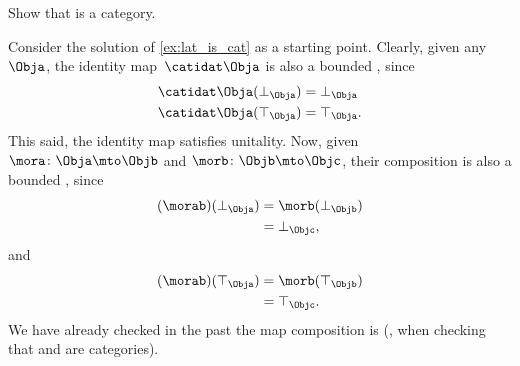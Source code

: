 \begin{exercise}
    \label{ex:boundlat_is_cat}
    Show that \BoundedLat is a category.
\end{exercise}

\begin{solution}
    Consider the solution of \cref{ex:lat_is_cat} as a starting point.
    Clearly, given any ~$\Obja$, the identity map~$\catidat\Obja$ is also a bounded , since
    \begin{equation}
        \begin{aligned}
            \catidat\Obja(\bot_\Obja) & =\bot_\Obja \\
            \catidat\Obja(\top_\Obja) & =\top_\Obja.
        \end{aligned}
    \end{equation}
    This said, the identity map satisfies unitality.
    Now, given  $\mora\colon \Obja \mto \Objb$ and  $\morb\colon \Objb\mto \Objc$, their composition is also a bounded , since
    \begin{equation}
        \begin{aligned}
            (\morab)(\bot_\Obja)
             & = \morb(\bot_\Objb) \\
             & = \bot_\Objc,
        \end{aligned}
    \end{equation}
    and
    \begin{equation}
        \begin{aligned}
            (\morab)(\top_\Obja)
             & = \morb(\top_\Objb) \\
             & = \top_\Objc.
        \end{aligned}
    \end{equation}
    We have already checked in the past the map composition is  (\eg, when checking that \Set and \Pos are categories).
\end{solution}
